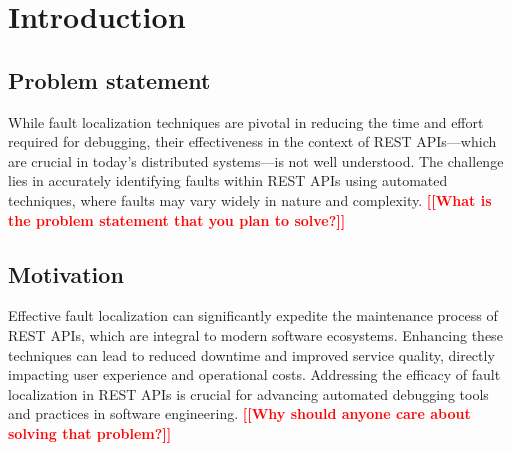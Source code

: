 \documentclass[conference]{IEEEtran}
\newcommand{\todo}[1]{\textcolor{red}{{\bfseries [[#1]]}}}
\begin{document}




\section{Introduction}
\label{sec:introduction}

\subsection{Problem statement}
    While fault localization techniques are pivotal in reducing the time and effort required for debugging, their effectiveness in the context of REST APIs—which are crucial in today's distributed systems—is not well understood. The challenge lies in accurately identifying faults within REST APIs using automated techniques, where faults may vary widely in nature and complexity.
    \todo{What is the problem statement that you plan to solve?}

\subsection{Motivation}
    Effective fault localization can significantly expedite the maintenance process of REST APIs, which are integral to modern software ecosystems. Enhancing these techniques can lead to reduced downtime and improved service quality, directly impacting user experience and operational costs. Addressing the efficacy of fault localization in REST APIs is crucial for advancing automated debugging tools and practices in software engineering.
    \todo{Why should anyone care about solving that problem?}
\end{document}
